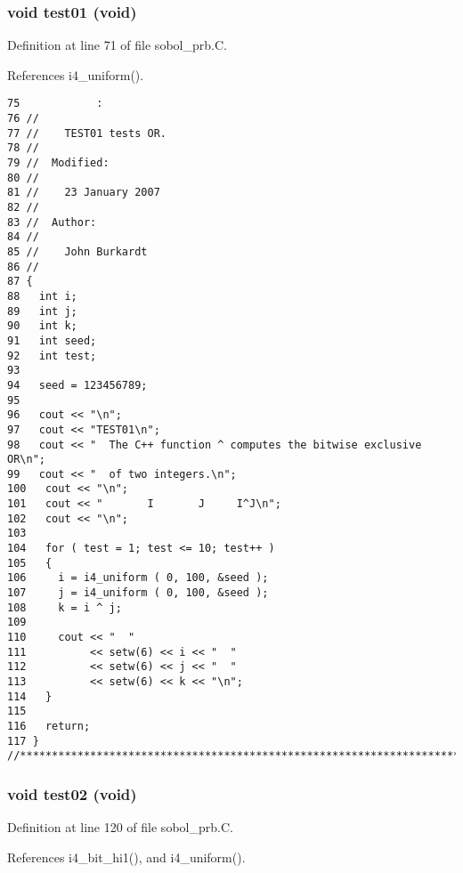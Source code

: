 \subsubsection{\setlength{\rightskip}{0pt plus 5cm}void test01 (void)}\label{sobol__prb_8C_849bf42660b0ed0bdce06b482cd61847}




Definition at line 71 of file sobol\_\-prb.C.

References i4\_\-uniform().

\begin{Code}\begin{verbatim}75            :
76 //
77 //    TEST01 tests OR.
78 //
79 //  Modified:
80 //
81 //    23 January 2007
82 //
83 //  Author:
84 //
85 //    John Burkardt
86 //
87 {
88   int i;
89   int j;
90   int k;
91   int seed;
92   int test;
93 
94   seed = 123456789;
95 
96   cout << "\n";
97   cout << "TEST01\n";
98   cout << "  The C++ function ^ computes the bitwise exclusive OR\n";
99   cout << "  of two integers.\n";
100   cout << "\n";
101   cout << "       I       J     I^J\n";
102   cout << "\n";
103 
104   for ( test = 1; test <= 10; test++ )
105   {
106     i = i4_uniform ( 0, 100, &seed );
107     j = i4_uniform ( 0, 100, &seed );
108     k = i ^ j;
109 
110     cout << "  "
111          << setw(6) << i << "  "
112          << setw(6) << j << "  "
113          << setw(6) << k << "\n";
114   }
115 
116   return;
117 }
//****************************************************************************80
\end{verbatim}
\end{Code}


\subsubsection{\setlength{\rightskip}{0pt plus 5cm}void test02 (void)}\label{sobol__prb_8C_e58824136dadefa1c95b4e510e87ce64}




Definition at line 120 of file sobol\_\-prb.C.

References i4\_\-bit\_\-hi1(), and i4\_\-uniform().

